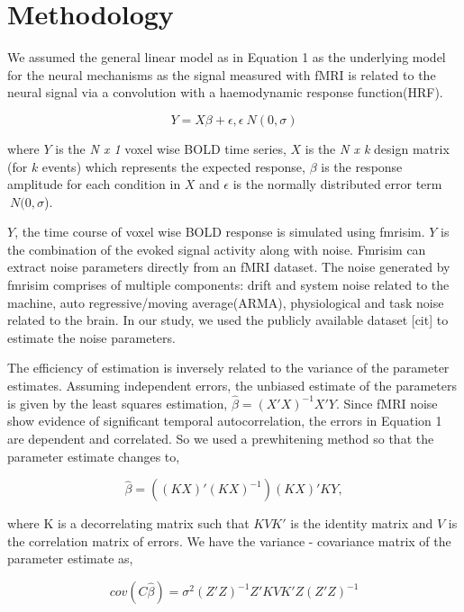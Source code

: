 \documentclass[11pt]{article}
\begin{document}
\section{Methodology}
We assumed the general linear model as in Equation 1 as the underlying model for the neural mechanisms as the signal measured with fMRI is related to the neural signal via a convolution with a haemodynamic response function(HRF).

\begin{equation}
Y=X\beta+ \epsilon,\epsilon ~ N(0,\sigma)
\end{equation}

where $Y$ is the \textit{N x 1} voxel wise BOLD time series, $X$ is the \textit{N x k} design matrix (for $k$ events) which represents the expected response, $\beta$ is the response amplitude for each condition in $X$ and $\epsilon$ is the normally distributed error term $~ N(0,\sigma$).\par

$Y$, the time course of voxel wise BOLD response is simulated using fmrisim. $Y$ is the combination of the evoked signal activity along with noise. Fmrisim can extract noise parameters directly from an fMRI dataset. The noise generated by fmrisim comprises of multiple components: drift and system noise related to the machine, auto regressive/moving average(ARMA), physiological and task noise related to the brain. In our study, we used the publicly available dataset [cit] to estimate the noise parameters.

The efficiency of estimation is inversely related to the variance of the parameter estimates. Assuming independent errors, the unbiased estimate of the parameters is given by the least squares estimation, \(\hat{\beta} = (X' X)^{-1} X' Y \). Since fMRI noise show evidence of significant temporal autocorrelation, the errors in Equation 1 are dependent and correlated. So we used a prewhitening method so that the parameter estimate changes to,

\begin{equation}
    \hat{\beta} = ((KX)' (KX)^{-1}) (KX)' KY,
\end{equation}

where K is a decorrelating matrix such that \(KVK'\) is the identity matrix and $V$ is the correlation matrix of errors. We have the variance - covariance matrix of the parameter estimate as,

\begin{equation}
    cov(C\hat{\beta}) = \sigma^2 (Z'Z)^{-1} Z'KVK'Z(Z'Z)^{-1}
\end{equation}
\end{document}
